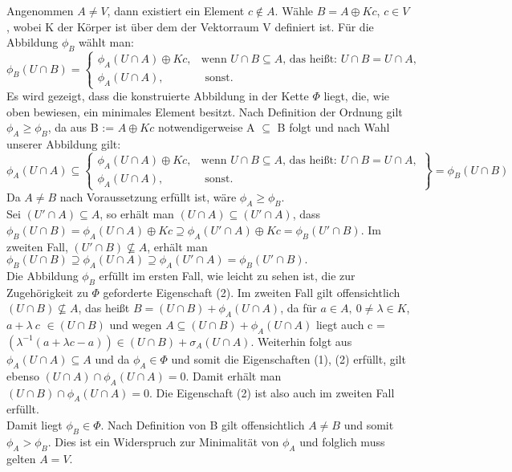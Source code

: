 {Angenommen $A \neq V$, dann existiert ein Element $c \notin  A$. Wähle $B = A \oplus Kc$, $c \in V $, wobei K der Körper ist über dem der Vektorraum V definiert ist. Für die Abbildung $\phi_B$ wählt man:
\[\phi_B( U \cap B)= \begin{cases}
  \phi_A(U\cap A) \oplus Kc,  & \text{wenn } U \cap B \subseteq A\text{, das heißt: } U \cap B = U \cap A,\\
  \phi_A(U\cap A), &  \text{ sonst.}
\end{cases}\]
Es wird gezeigt, dass die konstruierte Abbildung in der Kette $\Phi$ liegt, die, wie oben bewiesen, ein minimales Element besitzt. Nach Definition der Ordnung gilt $\phi_A \ge \phi_B$, da aus B := $A\oplus Kc$ notwendigerweise A $\subseteq$ B folgt und nach Wahl unserer Abbildung gilt:
\[\left.\phi_A(U \cap A) \subseteq \begin{cases}
  \phi_A(U\cap A) \oplus Kc,  & \text{wenn } U \cap B \subseteq A\text{, das heißt: } U \cap B = U \cap A,\\
  \phi_A(U\cap A), &  \text{ sonst.}
\end{cases}\right\}=\phi_B( U \cap B)\]
Da $A \neq B$ nach Voraussetzung erfüllt ist, wäre $\phi_A \ge \phi_B.$\\
Sei $(U' \cap A) \subseteq A$, so erhält man $(U \cap A) \subseteq ( U' \cap A)$, dass $\phi_B( U \cap B ) = \phi_A( U \cap A) \oplus Kc \supseteq \phi_A (U' \cap A) \oplus Kc = \phi_B(U' \cap B)$. Im zweiten Fall, $(U' \cap B) \nsubseteq A$, erhält man $\phi_B( U \cap B) \supseteq \phi_A( U \cap A) \supseteq \phi_A(U' \cap A) = \phi_B(U'\cap B).$ \\
Die Abbildung $\phi_B$ erfüllt im ersten Fall, wie leicht zu sehen ist, die zur Zugehörigkeit zu $\Phi$ geforderte Eigenschaft (2). Im zweiten Fall gilt offensichtlich $(U \cap B)\nsubseteq A$, das heißt $B = (U\cap B) + \phi_A( U \cap A)$, da für $ a\in A,~ 0 \neq \lambda \in K$, $a+\lambda~c$ $\in (U \cap B )$ und wegen $A \subseteq (U \cap B) + \phi_A(U\cap A)$ liegt auch c = $(\lambda^{-1} ( a + \lambda c - a)) \in (U \cap B) + \sigma_A(U\cap A)$. Weiterhin folgt aus $\phi_A (U \cap A) \subseteq A $ und da $\phi_A \in \Phi$ und somit die Eigenschaften (1), (2) erfüllt, gilt ebenso $(U \cap A) \cap \phi_A(U \cap A) = 0$. Damit erhält man $(U \cap B) \cap \phi_A(U \cap A) = 0$. Die Eigenschaft (2) ist also auch im zweiten Fall erfüllt.\\
Damit liegt $\phi_B \in \Phi$.
Nach Definition von B gilt offensichtlich $A \neq B$ und somit $\phi_A > \phi_B$. Dies ist ein Widerspruch zur Minimalität von $\phi_A$ und folglich muss gelten $A = V$. 
}
